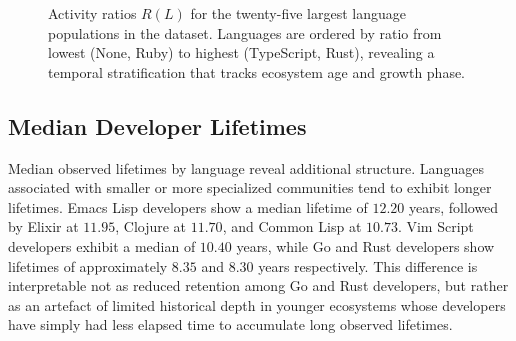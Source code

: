 \documentclass[12pt,a4paper]{article}
\begin{document}
\begin{figure}[h]
\centering
{}
\caption{Activity ratios $R(L)$ for the twenty-five largest language populations in the dataset. Languages are ordered by ratio from lowest (None, Ruby) to highest (TypeScript, Rust), revealing a temporal stratification that tracks ecosystem age and growth phase.}
\label{fig:ratios}
\end{figure}

\subsection{Median Developer Lifetimes}

Median observed lifetimes by language reveal additional structure. Languages associated with smaller or more specialized communities tend to exhibit longer lifetimes. Emacs Lisp developers show a median lifetime of $12.20$ years, followed by Elixir at $11.95$, Clojure at $11.70$, and Common Lisp at $10.73$. Vim Script developers exhibit a median of $10.40$ years, while Go and Rust developers show lifetimes of approximately $8.35$ and $8.30$ years respectively. This difference is interpretable not as reduced retention among Go and Rust developers, but rather as an artefact of limited historical depth in younger ecosystems whose developers have simply had less elapsed time to accumulate long observed lifetimes.
\end{document}
